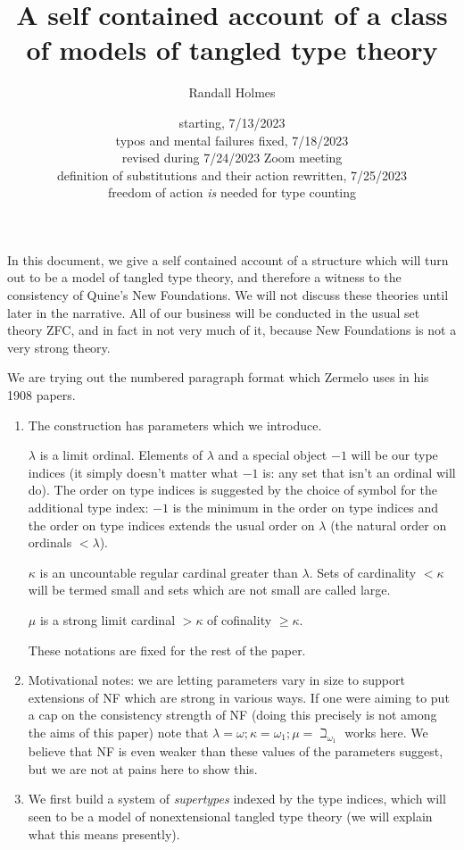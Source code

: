 \documentclass[12pt]{article}
\title{A self contained account of a class of models of tangled type theory}
\author{Randall Holmes}
\date{starting, 7/13/2023\\
typos and mental failures fixed, 7/18/2023\\
revised during 7/24/2023 Zoom meeting\\definition of substitutions and their action rewritten, 7/25/2023\\
freedom of action {\em is} needed for type counting}
\begin{document}
\maketitle

In this document, we give a self contained account of a structure which will turn out to be a model of tangled type theory, and therefore a witness to the consistency of Quine's New Foundations.
We will not discuss these theories until later in the narrative.  All of our business will be conducted in the usual set theory ZFC, and in fact in not very much of it, because New Foundations is not a very strong theory.

We are trying out the numbered paragraph format which Zermelo uses in his 1908 papers.

\begin{enumerate}

\item The construction has parameters which we introduce.

$\lambda$ is a limit ordinal.  Elements of $\lambda$ and a special object $-1$ will be our type indices (it simply doesn't matter what $-1$ is:  any set that isn't an ordinal will do).  The order on type indices is suggested by the choice of symbol for the additional type index:  $-1$ is the minimum in the order on type indices and the order on type indices extends the usual order on $\lambda$ (the natural order on ordinals $<\lambda$).

$\kappa$ is an uncountable regular cardinal greater than $\lambda$.  Sets of cardinality $<\kappa$ will be termed small and sets which are not small are called large.

$\mu$ is a strong limit cardinal $>\kappa$ of cofinality $\geq \kappa$.

These notations are fixed for the rest of the paper.

\item  Motivational notes:  we are letting parameters vary in size to support extensions of NF which are strong in various ways.  If one were aiming to put a cap on the consistency strength of NF (doing this precisely is not among the aims of this paper) note that $\lambda = \omega; \kappa = \omega_1; \mu = \beth_{\omega_1}$ works here.  We believe that NF is even weaker than these values of the parameters suggest, but we are not at pains here to show this.

\item We first build a system of {\em supertypes\/} indexed by the type indices, which will seen to be a model of nonextensional tangled type theory (we will explain what this means presently).


\end{enumerate}
\end{document}
